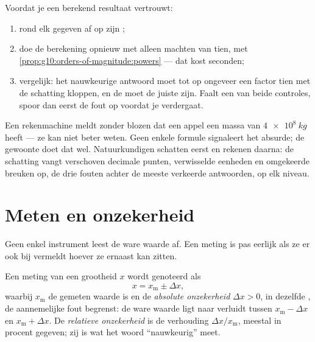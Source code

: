 \begin{method}\label{met:g10:orders-of-magnitude:sanity}
Voordat je een berekend resultaat vertrouwt:
\begin{enumerate}
  \item rond elk gegeven af op zijn ;
  \item doe de berekening opnieuw met alleen machten van tien, met
        \cref{prop:g10:orders-of-magnitude:powers} --- dat kost
        seconden;
  \item vergelijk: het nauwkeurige antwoord moet tot op ongeveer een
        factor tien met de schatting kloppen, en de  moet de
        juiste zijn. Faalt een van beide controles, spoor dan eerst de
        fout op voordat je verdergaat.
\end{enumerate}
\end{method}

\begin{remark}\label{rem:g10:orders-of-magnitude:sanity}
Een rekenmachine meldt zonder blozen dat een appel een massa van
$\qty{4e8}{kg}$ heeft --- ze kan niet beter weten. Geen enkele formule
signaleert het absurde; de gewoonte doet dat wel. Natuurkundigen
schatten eerst en rekenen daarna: de schatting vangt verschoven
decimale punten, verwisselde eenheden en omgekeerde breuken op, de drie
fouten achter de meeste verkeerde antwoorden, op elk niveau.
\end{remark}

\section{Meten en onzekerheid}

Geen enkel instrument leest de ware waarde af. Een meting is pas
eerlijk als ze er ook bij vermeldt hoever ze ernaast kan zitten.

\begin{definition}\label{def:g10:orders-of-magnitude:uncertainty}
Een meting van een grootheid $x$ wordt genoteerd als
\[
x = x_{\text{m}} \pm \Delta x ,
\]
waarbij $x_{\text{m}}$ de gemeten waarde is en de \emph{absolute
onzekerheid} $\Delta x > 0$, in dezelfde
, de aannemelijke fout begrenst: de ware waarde ligt naar
verluidt tussen $x_{\text{m}} - \Delta x$ en $x_{\text{m}} + \Delta x$.
De \emph{relatieve onzekerheid} is de
verhouding $\Delta x / x_{\text{m}}$, meestal in procent gegeven; zij
is wat het woord ``nauwkeurig'' meet.
\end{definition}

